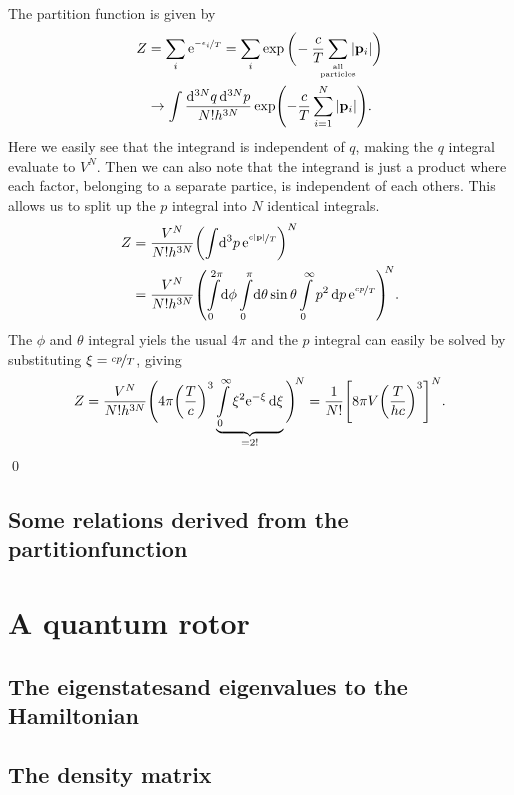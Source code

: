 \documentclass[11pt,letter, swedish, english
]{article}
\begin{document}
The partition function is given by
\begin{equation}
\begin{aligned}
Z&=\sum_i\ee^{\nicefrac{-\epsilon_i}{T}}
=\sum_i\exp\bigg(\!-\frac{c}{T}
\hspace{-5pt}\sum_{\stackrel{\text{\tiny all}}{\text{\tiny particles}}}\hspace{-5pt}
|\vb{p}_i|\bigg)\\
&\to \int\frac{\dd[3N]{q}\dd[3N]{p}}{N!h^{3N}}
\exp(-\frac{c}{T}\sum_{i=1}^N \abs{\vb{p}_i}).%
\end{aligned}
\end{equation}
Here we easily see that the integrand is independent of $q$, making
the $q$ integral evaluate to $V^N$. Then we can also note that the
integrand is just a product where each factor, belonging to a separate
partice, is independent of each others. This allows us to split up the
$p$ integral into $N$ identical integrals.
\begin{equation}
\begin{aligned}
Z&=\frac{V^N}{N!h^{3N}}
\qty(\int\!\dd[3]{p} \ee^{\nicefrac{c|\vb{p}|}{T}})^N\\
&=\frac{V^N}{N!h^{3N}}
\qty(\int_0^{2\pi}\!\dd{\phi}\int_0^\pi\!\dd{\theta}\sin\theta
\int_0^\infty p^2\dd{p}\ee^{\nicefrac{cp}{T}})^{\!\!N}.
\end{aligned}
\end{equation}
The $\phi$ and $\theta$ integral yiels the usual $4\pi$ and the $p$
integral can easily be solved by substituting $\xi=\nicefrac{cp}{T}$,
giving
\begin{equation}
Z=\frac{V^N}{N!h^{3N}}
\Bigg(4\pi \qty(\frac{T}{c})^3
\underbrace{\int_0^\infty \xi^2\ee^{-\xi}\id\xi}_{=2!}\Bigg)^{\!N}
=\frac{1}{N!} \qty[8\pi V \qty(\frac{T}{hc})^3]^N.
\end{equation}
\qed

\subsection*{Some relations derived from the partitionfunction}



\section{A quantum rotor}

\subsection{The eigenstatesand eigenvalues to the Hamiltonian}


\subsection{The density matrix}
\end{document}
